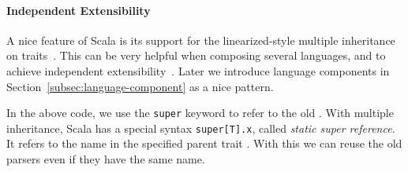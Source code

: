 \vspace{-.05in}
\paragraph{Independent Extensibility}
A nice feature of Scala is its support for the linearized-style multiple
inheritance on traits~\cite{odersky2004overview}. This can be very helpful when
composing several languages, and to achieve independent
extensibility~\cite{odersky2005independently}. Later we introduce language components
in Section~\ref{subsec:language-component} as a nice pattern.

In the above code, we use the \lstinline{super} keyword to refer to the old .
With multiple inheritance, Scala has a special syntax
\lstinline{super[T].x}, called \textit{static super reference}. It refers to the name
 in the specified parent trait . With this we can reuse
the old parsers even if they have the same name.



\begin{comment}
\bruno{You can present the abstract example, as you do
  here, but you should also present a concrete example. You
already have Var, maybe you can add another language extension for
boolean literals. Show the code for the boolean literals parsing as
well as the composition code.}

Interestingly note that, due to the use of multiple inheritance, we
need two different super calls.\bruno{expand here. People may not
be familiar with scala super calls, you have to explain what the
syntax does.}
\end{comment}


